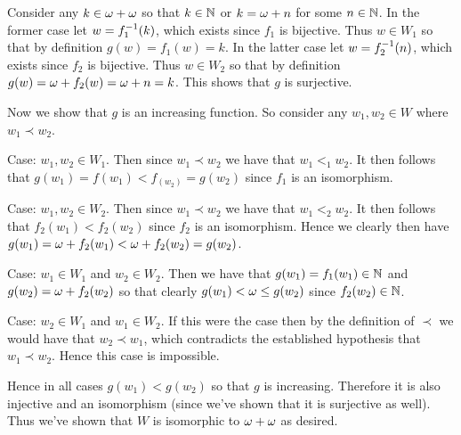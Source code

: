 {{    Consider any $k \in \omega + \omega$ so that $k \in \mathbb{N}$ or $k = \omega + n$ for some $n \in \mathbb{N}$.
    In the former case let $w = f_1^{-1}(k)$, which exists since $f_1$ is bijective.
    Thus $w \in W_1$ so that by definition $g(w) = f_1(w) = k$.
    In the latter case let $w = f_2^{-1}(n)$, which exists since $f_2$ is bijective.
    Thus $w \in W_2$ so that by definition $g(w) = \omega + f_2(w) = \omega + n = k$.
    This shows that $g$ is surjective.

    Now we show that $g$ is an increasing function.
    So consider any $w_1, w_2 \in W$ where $w_1 \prec w_2$.

    Case: $w_1, w_2 \in W_1$.
    Then since $w_1 \prec w_2$ we have that $w_1 <_1 w_2$.
    It then follows that $g(w_1) = f(w_1) < f_(w_2) = g(w_2)$ since $f_1$ is an isomorphism.

    Case: $w_1, w_2 \in W_2$.
    Then since $w_1 \prec w_2$ we have that $w_1 <_2 w_2$.
    It then follows that $f_2(w_1) < f_2(w_2)$ since $f_2$ is an isomorphism.
    Hence we clearly then have $g(w_1) = \omega + f_2(w_1) < \omega + f_2(w_2) = g(w_2)$.

    Case: $w_1 \in W_1$ and $w_2 \in W_2$.
    Then we have that $g(w_1) = f_1(w_1) \in \mathbb{N}$ and $g(w_2) = \omega + f_2(w_2)$ so that clearly $g(w_1) < \omega \leq g(w_2)$ since $f_2(w_2) \in \mathbb{N}$.

    Case: $w_2 \in W_1$ and $w_1 \in W_2$.
    If this were the case then by the definition of $\prec$ we would have that $w_2 \prec w_1$, which contradicts the established hypothesis that $w_1 \prec w_2$.
    Hence this case is impossible.

    Hence in all cases $g(w_1) < g(w_2)$ so that $g$ is increasing.
    Therefore it is also injective and an isomorphism (since we've shown that it is surjective as well).
    Thus we've shown that $W$ is isomorphic to $\omega + \omega$ as desired.
  }
}

